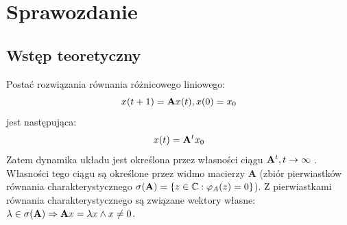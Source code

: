 \documentclass{article}
\begin{document}
\section*{Sprawozdanie}
\subsection*{Wstęp teoretyczny}
Postać rozwiązania równania różnicowego liniowego:
\[
x(t+1) = \bold{A}x(t), x(0)=x_0
\]
jest następująca:
\[
x(t) = \bold{A}^t x_0
\]
Zatem dynamika układu jest okre\'slona przez własno\'sci ciągu $\bold{A}^t, t \to \infty$ . Własno\'sci tego ciągu są okre\'slone przez widmo macierzy \textbf{A} (zbiór pierwiastków równania charakterystycznego $\sigma(\bold{A}) = \{ z \in \mathbb{C} :\varphi_A(z) = 0 \}$). Z pierwiastkami równania charakterystycznego są związane wektory własne: $\lambda \in \sigma(\bold{A}) \Rightarrow \bold{A}x=\lambda x \wedge x\neq 0$.
\end{document}
